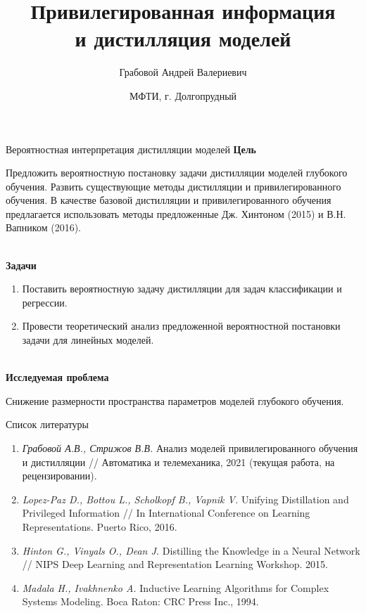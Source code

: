 \documentclass[10pt,pdf,hyperref={unicode}]{beamer}
\title[\hbox to 56mm{Дистилляция и привилегированная информация \hfill\insertframenumber\,/\,\inserttotalframenumber}]
{Привилегированная информация\\
и дистилляция моделей}
\author[А.\,В.~Грабовой]{\large Грабовой Андрей Валериевич}
\institute{\large
Московский физико-технический институт}
\date{\footnotesize{МФТИ, г. Долгопрудный}}
\begin{document}
\begin{frame}
\titlepage
\end{frame}

\begin{frame}{Вероятностная интерпретация дистилляции моделей}
\justifying
\textbf{Цель}

Предложить вероятностную постановку задачи дистилляции моделей глубокого обучения. Развить существующие методы дистилляции и привилегированного обучения. В качестве базовой дистилляции и привилегированного обучения предлагается использовать методы предложенные Дж. Хинтоном (2015) и В.Н. Вапником (2016).

~\\
\textbf{Задачи}

\begin{enumerate}
\justifying
	\item Поставить вероятностную задачу дистилляции для задач классификации и регрессии.
	\item Провести теоретический анализ предложенной вероятностной постановки задачи для линейных моделей.
\end{enumerate}

~\\
\textbf{Исследуемая проблема}

Снижение размерности пространства параметров моделей глубокого обучения.

\end{frame}

\begin{frame}{Список литературы}
\justifying
\begin{enumerate}
	\item \textit{Грабовой А.В., Стрижов В.В.} Анализ моделей привилегированного обучения и дистилляции // Автоматика и телемеханика, 2021 (текущая работа, на рецензировании).
	\item \textit{Lopez-Paz D., Bottou L., Scholkopf B., Vapnik V.} Unifying Distillation and Privileged Information // In International Conference on Learning Representations. Puerto Rico, 2016.
	\item \textit{Hinton G., Vinyals O., Dean J.} Distilling the Knowledge in a Neural Network // NIPS Deep Learning and Representation Learning Workshop. 2015.
	\item \textit{Madala H., Ivakhnenko A.} Inductive Learning Algorithms for Complex Systems Modeling. Boca Raton: CRC Press Inc., 1994.
\end{enumerate}
\end{frame}
\end{document}
